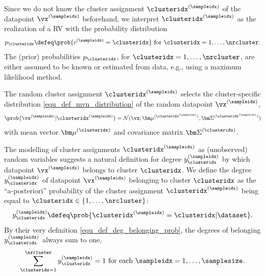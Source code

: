 \documentclass[12pt]{report}
\begin{document}
Since we do not know the cluster assignment $\clusteridx^{(\sampleidx)}$ of the datapoint $\vx^{(\sampleidx)}$ 
beforehand, we interpret $\clusteridx^{(\sampleidx)}$ as the realization of a RV with the probability distribution  
\begin{equation} 
\label{equ_def_cluster_prob}
p_{\clusteridx} \defeq \prob{c^{(\sampleidx)}=\clusteridx} \mbox{ for } \clusteridx=1,\ldots,\nrcluster.
\end{equation}  
The (prior) probabilities $p_{\clusteridx}$, for $\clusteridx=1,\ldots,\nrcluster$, 
are either assumed to be known or estimated from data, e.g., using a maximum 
likelihood method. 

The random cluster assignment $\clusteridx^{(\sampleidx)}$ selects the cluster-specific 
distribution \eqref{equ_def_mvn_distribution} of the random datapoint $\vx^{(\sampleidx)}$, 
\begin{equation}
\label{equ_cond_dist_GMM}
 \prob{\vx^{(\sampleidx)} | \clusteridx^{(\sampleidx)} } = \mathcal{N} (\vx; {\bm \mu}^{(\clusteridx^{(\sampleidx)})}, {\bm \Sigma}^{(\clusteridx^{(\sampleidx)})})
\end{equation} 
with mean vector ${\bm \mu}^{(\clusteridx)}$ and covariance matrix ${\bm \Sigma}^{(\clusteridx)}$. 

The modelling of cluster assignments $\clusteridx^{(\sampleidx)}$ as 
(unobserved) random variables suggests a natural definition for degree 
$y^{(\sampleidx)}_{\clusteridx}$ by which datapoint $\vx^{(\sampleidx)}$ 
belongs to cluster $\clusteridx$. We define the degree $y^{(\sampleidx)}_{\clusteridx}$ 
of datapoint $\vx^{(\sampleidx)}$ belonging to cluster $\clusteridx$ as 
the ``a-posteriori'' probability of the cluster assignment $\clusteridx^{(\sampleidx)}$ 
being equal to $\clusteridx \in \{1,\ldots,\nrcluster\}$: 
\begin{equation}
\label{equ_def_deg_belonging_prob}
y^{(\sampleidx)}_{\clusteridx} \defeq \prob{ \clusteridx^{(\sampleidx)} = \clusteridx | \dataset}.
\end{equation} 
By their very definition \eqref{equ_def_deg_belonging_prob}, 
the degrees of belonging $y^{(\sampleidx)}_{\clusteridx}$ always 
sum to one, 
\begin{equation} 
\label{equ_dob_sum_to_one}
\sum_{\clusteridx=1}^{\nrcluster} y^{(\sampleidx)}_{\clusteridx}=1 \mbox{ for each } \sampleidx=1,\ldots,\samplesize.
\end{equation}  
\end{document}
